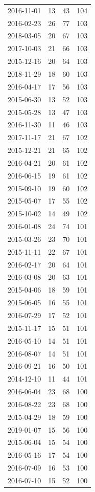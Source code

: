 \begin{tabular}{lrrr}
2016-11-01 & 13 & 43 & 104 \\
2016-02-23 & 26 & 77 & 103 \\
2018-03-05 & 20 & 67 & 103 \\
2017-10-03 & 21 & 66 & 103 \\
2015-12-16 & 20 & 64 & 103 \\
2018-11-29 & 18 & 60 & 103 \\
2016-04-17 & 17 & 56 & 103 \\
2015-06-30 & 13 & 52 & 103 \\
2015-05-28 & 13 & 47 & 103 \\
2016-11-30 & 11 & 46 & 103 \\
2017-11-17 & 21 & 67 & 102 \\
2015-12-21 & 21 & 65 & 102 \\
2016-04-21 & 20 & 61 & 102 \\
2016-06-15 & 19 & 61 & 102 \\
2015-09-10 & 19 & 60 & 102 \\
2015-05-07 & 17 & 55 & 102 \\
2015-10-02 & 14 & 49 & 102 \\
2016-01-08 & 24 & 74 & 101 \\
2015-03-26 & 23 & 70 & 101 \\
2015-11-11 & 22 & 67 & 101 \\
2016-02-17 & 20 & 64 & 101 \\
2016-03-08 & 20 & 63 & 101 \\
2015-04-06 & 18 & 59 & 101 \\
2015-06-05 & 16 & 55 & 101 \\
2016-07-29 & 17 & 52 & 101 \\
2015-11-17 & 15 & 51 & 101 \\
2016-05-10 & 14 & 51 & 101 \\
2016-08-07 & 14 & 51 & 101 \\
2016-09-21 & 16 & 50 & 101 \\
2014-12-10 & 11 & 44 & 101 \\
2016-06-04 & 23 & 68 & 100 \\
2016-08-22 & 23 & 68 & 100 \\
2015-04-29 & 18 & 59 & 100 \\
2019-01-07 & 15 & 56 & 100 \\
2015-06-04 & 15 & 54 & 100 \\
2016-05-16 & 17 & 54 & 100 \\
2016-07-09 & 16 & 53 & 100 \\
2016-07-10 & 15 & 52 & 100 \\

\end{tabular}

